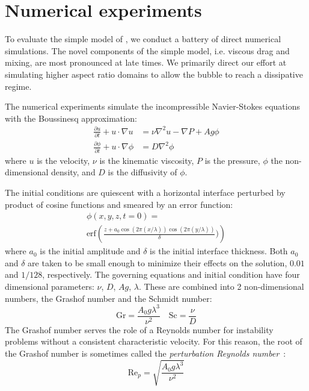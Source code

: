 \section{Numerical experiments} 

To evaluate the simple model of , we conduct a battery of direct numerical simulations.
The novel components of the simple model, i.e. viscous drag and mixing, are most pronounced at late times.
We primarily direct our effort at simulating higher aspect ratio domains to allow the bubble to reach a dissipative regime.

The numerical experiments simulate the incompressible Navier-Stokes equations with the Boussinesq approximation:
\begin{align}
\frac{\partial u}{\partial t} + u \cdot \nabla u &= \nu \nabla^2 u - \nabla P + A g \phi \\
\frac{\partial \phi}{\partial t} + u \cdot \nabla \phi &= D \nabla^2 \phi 
\end{align}
where $u$ is the velocity,
$\nu$ is the kinematic viscosity,
$P$ is the pressure,
$\phi$ the non-dimensional density,
and $D$ is the diffusivity of $\phi$.

The initial conditions are quiescent with a horizontal interface perturbed by product of cosine functions and smeared by an error function:
\begin{equation}
\begin{split}
	\phi(x,y,z,t=0) = \\ 
	\text{erf}\left(\frac{z + a_0 \cos(2 \pi (x/\lambda)) \cos(2 \pi (y/\lambda))}{\delta})\right)
\end{split}
\end{equation}
where $a_0$ is the initial amplitude and $\delta$ is the initial interface thickness.
Both $a_0$ and $\delta$ are taken to be small enough to minimize their effects on the solution, $0.01$ and $1/128$, respectively.
The governing equations and initial condition have four dimensional parameters: $\nu$, $D$, $Ag$, $\lambda$.
These are combined into 2 non-dimensional numbers, the Grashof number and the Schmidt number:
\begin{equation}
\text{Gr} = \frac{A_0 g \lambda^3}{\nu^2} \quad \text{Sc} = \frac{\nu}{D}
\end{equation}
The Grashof number serves the role of a Reynolds number for instability problems without a consistent characteristic velocity.
For this reason, the root of the Grashof number is sometimes called the \textit{perturbation Reynolds number}~\cite{Wei2012}:
\begin{equation}
\text{Re}_p = \sqrt{\frac{A_0 g \lambda^3}{\nu^2}}
\end{equation}

